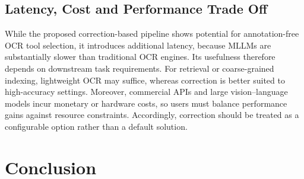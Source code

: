 \documentclass[11pt]{article}
\begin{document}
\subsection{Latency, Cost and Performance Trade Off}
While the proposed correction-based pipeline shows potential for annotation-free OCR tool selection, it introduces additional latency, because MLLMs are substantially slower than traditional OCR engines. Its usefulness therefore depends on downstream task requirements. For retrieval or coarse-grained indexing, lightweight OCR may suffice, whereas correction is better suited to high-accuracy settings. Moreover, commercial APIs and large vision–language models incur monetary or hardware costs, so users must balance performance gains against resource constraints. Accordingly, correction should be treated as a configurable option rather than a default solution.
\section{Conclusion}
\end{document}
